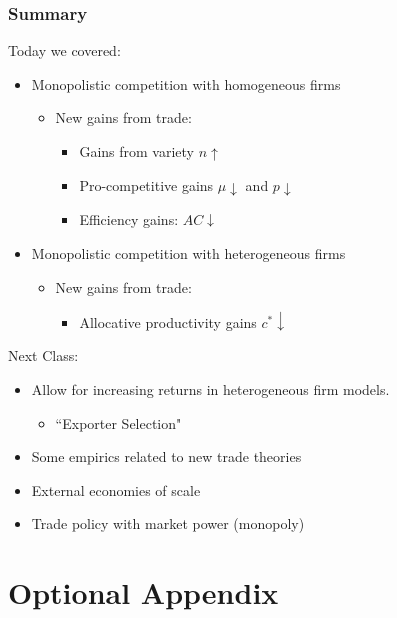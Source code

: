 \documentclass{beamer}
\begin{document}
\begin{frame}
	\frametitle{Summary}
Today we covered:
\begin{itemize}
	\item Monopolistic competition with homogeneous firms
		\begin{itemize}
			\item New gains from trade:
				\begin{itemize}
					\item Gains from variety $n\uparrow$
					\item Pro-competitive gains $\mu \downarrow $ and $p \downarrow$
					\item Efficiency gains: $AC \downarrow$
				\end{itemize}
		\end{itemize}
		\item Monopolistic competition with heterogeneous firms
		\begin{itemize}
			\item New gains from trade:
			\begin{itemize}
			\item Allocative productivity gains $c^* \downarrow $
			\end{itemize}
		\end{itemize}
\end{itemize}
Next Class:
	\begin{itemize}
		\item Allow for increasing returns in heterogeneous firm models.
			\begin{itemize}
				\item ``Exporter Selection"
			\end{itemize}
		\item Some empirics related to new trade theories
		\item External economies of scale
		\item Trade policy with market power (monopoly)
	\end{itemize}
	
\end{frame}

\section{Optional Appendix}
\end{document}
